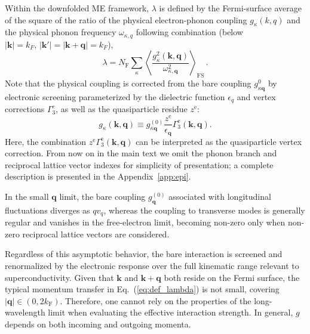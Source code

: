 \documentclass[%
 reprint,
superscriptaddress,
 amsmath,amssymb,
 aps,
prx,
]{revtex4-2}
\newcommand{\bq}{\mathbf{q}}
\newcommand{\bk}{\mathbf{k}}
\newcommand{\txe}{\text{e}}
\newcommand{\txF}{\text{F}}
\newcommand{\txFS}{\text{FS}}
\newcommand{\ajm}[1]{{\color{blue} #1}}
\begin{document}
Within the downfolded ME framework, $\lambda$ 
is defined by the Fermi-surface average of the square of the ratio of the physical electron-phonon coupling $g_\kappa(k,q)$ and the physical  phonon frequency $\omega_{\kappa,q}$ following combination (below $|\bk |=k_F,\,  |\bk ' | = | \bk +\bq |=k_F$), 
\begin{equation}
\label{eq:def_lambda}
\lambda = N_\txF \sum_{\kappa} \left\langle \frac{g_\kappa^2(\bk, \bq) }
          {\omega^2_{\kappa, \bq} }   \right\rangle_{\txFS} \, .
\end{equation}
Note that the physical coupling is corrected from the bare coupling $g^0_{\kappa\bq}$ by  electronic screening parameterized by the dielectric function $\epsilon_q$ and vertex corrections $\Gamma^e_3$, as well as
the quasiparticle residue $z^\txe$:
\begin{equation}
\label{eq:eft_g}
g_{\kappa}(\bk, \bq) \equiv g^{(0)}_{\kappa\bq} \frac{z^\txe}{\epsilon_\bq}\Gamma_3^\txe(\bk,\bq).
\end{equation}
Here, the combination $z^\txe \Gamma_3^\txe(\bk,\bq)$ can be interpreted as the quasiparticle vertex correction.
From now on in the main text  we omit the phonon branch and reciprocal lattice vector indexes for simplicity of presentation; a complete description is presented in the Appendix~\ref{app:epi}.



In the small $\bq$ limit, the bare coupling $g^{(0)}_\bq$ associated with longitudinal fluctuations diverges as $qv_q$, whereas the coupling to transverse modes is generally regular and vanishes in the free-electron limit, becoming non-zero only when non-zero reciprocal lattice vectors are considered.

Regardless of this asymptotic behavior, the bare interaction is screened and renormalized by the electronic response over the full kinematic range relevant to superconductivity. Given that $\bk$ and $\bk + \bq$ both reside on the Fermi surface, the typical momentum transfer in Eq.~(\ref{eq:def_lambda}) is not small, covering $|\bq | \in (0,2k_\txF)$. Therefore, one cannot rely on the properties of the long-wavelength limit when evaluating the effective interaction strength. In general, $g$ depends on both incoming and outgoing momenta.
\end{document}
